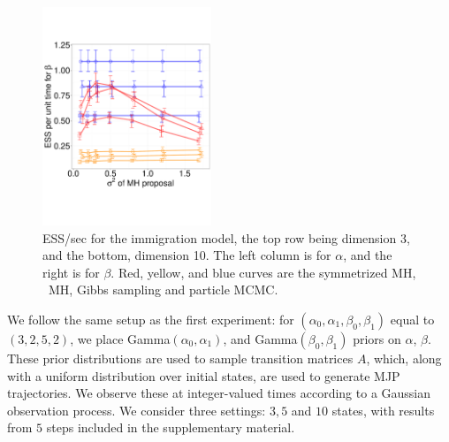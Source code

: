 {\begin{figure}
\begin{minipage}[!hp]{0.9\linewidth}
    \hspace{.2in}
    \includegraphics [width=0.45\textwidth, angle=0]{figs/q_10_beta.pdf}
    \vspace{-0.5 in}
  \end{minipage}
    \caption{ESS/sec for the immigration model, the top row being dimension 3, and the bottom,
      dimension 10. The left column is for $\alpha$, and the 
    right is for $\beta$. Red, yellow, and blue curves are the symmetrized MH,
  \naive\ MH, Gibbs sampling and particle MCMC.}
     \label{fig:ESS_Q_D10}
  \end{figure}
We follow the same setup as the first experiment:
for $(\alpha_0,\alpha_1,\beta_0,\beta_1)$ equal to $(3,2,5,2)$,
we place Gamma$(\alpha_0,\alpha_1)$, and Gamma$(\beta_0, \beta_1)$ priors on 
$\alpha$, $\beta$. These prior distributions are used to sample transition 
matrices $A$, which, along with a uniform distribution over initial states,
are used to generate MJP trajectories. We observe these at integer-valued
times according to a Gaussian observation process.
We consider three settings: $3, 5$ and $10$ states, with results from $5$ 
steps included in the supplementary material. 

}
